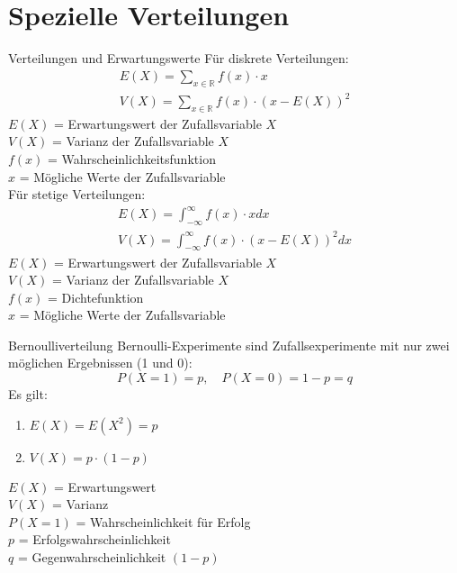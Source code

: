 \section{Spezielle Verteilungen}
\begin{definition}{Verteilungen und Erwartungswerte}
Für diskrete Verteilungen:
$$
\begin{gathered}
E(X)=\sum_{x \in \mathbb{R}} f(x) \cdot x \\
V(X)=\sum_{x \in \mathbb{R}} f(x) \cdot(x-E(X))^2
\end{gathered}
$$
$E(X)$ = Erwartungswert der Zufallsvariable $X$\\
$V(X)$ = Varianz der Zufallsvariable $X$\\
$f(x)$ = Wahrscheinlichkeitsfunktion\\
$x$ = Mögliche Werte der Zufallsvariable\\

Für stetige Verteilungen:
$$
\begin{gathered}
E(X)=\int_{-\infty}^{\infty} f(x) \cdot x dx \\
V(X)=\int_{-\infty}^{\infty} f(x) \cdot(x-E(X))^2 dx
\end{gathered}
$$
$E(X)$ = Erwartungswert der Zufallsvariable $X$\\
$V(X)$ = Varianz der Zufallsvariable $X$\\
$f(x)$ = Dichtefunktion\\
$x$ = Mögliche Werte der Zufallsvariable\\
\end{definition}

\begin{definition}{Bernoulliverteilung}
Bernoulli-Experimente sind Zufallsexperimente mit nur zwei möglichen Ergebnissen (1 und 0):
$$
P(X=1)=p, \quad P(X=0)=1-p=q
$$
Es gilt:
\begin{enumerate}
	\item $E(X)=E(X^2)=p$
	\item $V(X)=p \cdot(1-p)$
\end{enumerate}
\hfill \break
$E(X)$ = Erwartungswert\\
$V(X)$ = Varianz\\
$P(X=1)$ = Wahrscheinlichkeit für Erfolg\\
$p$ = Erfolgswahrscheinlichkeit\\
$q$ = Gegenwahrscheinlichkeit $(1-p)$\\
\end{definition}


